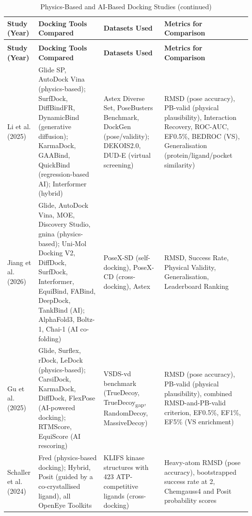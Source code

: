 \begingroup\footnotesize
\begin{longtable}[]{@{}
  >{\raggedright\arraybackslash}p{}
  >{\raggedright\arraybackslash}p{}
  >{\raggedright\arraybackslash}p{}
  >{\raggedright\arraybackslash}p{}@{}}
\caption[Physics-Based and AI-Based Docking Studies]{Physics-Based and AI-Based Docking Studies}\label{tab:literature-comparisons}\tabularnewline
\toprule\noalign{}
{\raggedright \textbf{Study (Year)}} & \centering\arraybackslash\textbf{Docking Tools Compared} & \centering\arraybackslash\textbf{Datasets Used} & \centering\arraybackslash\textbf{Metrics for Comparison} \\
\midrule\noalign{}
\endfirsthead
\caption[]{Physics-Based and AI-Based Docking Studies (continued)}\tabularnewline

\toprule\noalign{}
{\raggedright \textbf{Study (Year)}} & \centering\arraybackslash\textbf{Docking Tools Compared} & \centering\arraybackslash\textbf{Datasets Used} & \centering\arraybackslash\textbf{Metrics for Comparison} \\
\midrule\noalign{}
\endhead
\bottomrule\noalign{}
\endlastfoot
Li et al. (2025) \cite{ref013} & Glide SP, AutoDock Vina (physics-based); SurfDock, DiffBindFR, DynamicBind (generative diffusion); KarmaDock, GAABind, QuickBind (regression-based AI); Interformer (hybrid) & Astex Diverse Set, PoseBusters Benchmark, DockGen (pose/validity); DEKOIS2.0, DUD-E (virtual screening) & RMSD (pose accuracy), PB-valid (physical plausibility), Interaction Recovery, ROC-AUC, EF0.5\%, BEDROC (VS), Generalisation (protein/ligand/pocket similarity) \\
Jiang et al. (2026) \cite{ref012} & Glide, AutoDock Vina, MOE, Discovery Studio, gnina (physics-based); Uni-Mol Docking V2, DiffDock, SurfDock, Interformer, EquiBind, FABind, DeepDock, TankBind (AI); AlphaFold3, Boltz-1, Chai-1 (AI co-folding) & PoseX-SD (self-docking), PoseX-CD (cross-docking), Astex & RMSD, Success Rate, Physical Validity, Generalisation, Leaderboard Ranking \\
Gu et al. (2025) \cite{ref032} & Glide, Surflex, rDock, LeDock (physics-based); CarsiDock, KarmaDock, DiffDock, FlexPose (AI-powered docking); RTMScore, EquiScore (AI rescoring) & VSDS-vd benchmark (TrueDecoy, TrueDecoy\textsubscript{gap}, RandomDecoy, MassiveDecoy) & RMSD (pose accuracy), PB-valid (physical plausibility), combined RMSD-and-PB-valid criterion, EF0.5\%, EF1\%, EF5\% (VS enrichment) \\
Schaller et al. (2024) \cite{ref033} & Fred (physics-based docking); Hybrid, Posit (guided by a co-crystallised ligand), all OpenEye Toolkits & 589 KLIFS kinase structures with 423 ATP-competitive ligands (cross-docking) & Heavy-atom RMSD (pose accuracy), bootstrapped success rate at 2\angstrom{}, Chemgauss4 and Posit probability scores \\
\end{longtable}
\endgroup

